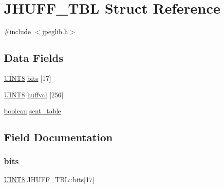 \hypertarget{struct_j_h_u_f_f___t_b_l}{}\section{J\+H\+U\+F\+F\+\_\+\+T\+BL Struct Reference}
\label{struct_j_h_u_f_f___t_b_l}


{\ttfamily \#include $<$jpeglib.\+h$>$}

\subsection*{Data Fields}
\begin{DoxyCompactItemize}
\item 
\hyperlink{jmorecfg_8h_adfb9a8ea1dd59f151065f763e1e9acd6}{U\+I\+N\+T8} \hyperlink{struct_j_h_u_f_f___t_b_l_a68b0ec25d6d06c13e0a4f74fbb683b3f}{bits} \mbox{[}17\mbox{]}
\item 
\hyperlink{jmorecfg_8h_adfb9a8ea1dd59f151065f763e1e9acd6}{U\+I\+N\+T8} \hyperlink{struct_j_h_u_f_f___t_b_l_a7aad276f6ced97323bb94ba5e6220961}{huffval} \mbox{[}256\mbox{]}
\item 
\hyperlink{jconfig_8h_a7670a4e8a07d9ebb00411948b0bbf86d}{boolean} \hyperlink{struct_j_h_u_f_f___t_b_l_a387c655e83d0d57c50802856d630f37b}{sent\+\_\+table}
\end{DoxyCompactItemize}


\subsection{Field Documentation}
\mbox{\label{struct_j_h_u_f_f___t_b_l_a68b0ec25d6d06c13e0a4f74fbb683b3f}} 
\subsubsection{\texorpdfstring{bits}{bits}}
{\footnotesize\ttfamily \hyperlink{jmorecfg_8h_adfb9a8ea1dd59f151065f763e1e9acd6}{U\+I\+N\+T8} J\+H\+U\+F\+F\+\_\+\+T\+B\+L\+::bits\mbox{[}17\mbox{]}}

\mbox{\label{struct_j_h_u_f_f___t_b_l_a7aad276f6ced97323bb94ba5e6220961}} 
